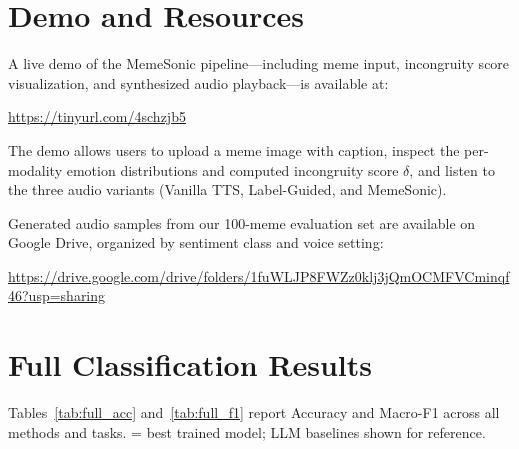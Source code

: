\appendix

\section{Demo and Resources}
\label{sec:demo}

A live demo of the MemeSonic pipeline—including meme input, incongruity score visualization,
and synthesized audio playback—is available at:

\begin{center}
  \url{https://tinyurl.com/4schzjb5}
\end{center}

The demo allows users to upload a meme image with caption, inspect the per-modality emotion
distributions and computed incongruity score $\delta$, and listen to the three audio variants
(Vanilla TTS, Label-Guided, and MemeSonic).

Generated audio samples from our 100-meme evaluation set are available on Google Drive,
organized by sentiment class and voice setting:

\begin{center}
  \url{https://drive.google.com/drive/folders/1fuWLJP8FWZz0klj3jQmOCMFVCminqf46?usp=sharing}
\end{center}

\section{Full Classification Results}
\label{sec:full_results}

Tables~\ref{tab:full_acc} and~\ref{tab:full_f1} report Accuracy and Macro-F1 across all methods
and tasks.  = best trained model; LLM baselines shown for reference.

